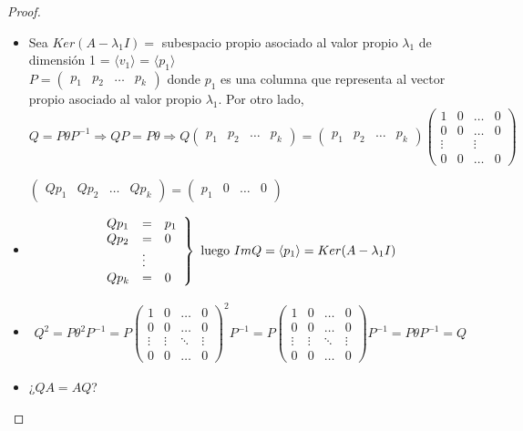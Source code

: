 \begin{proof}
    \begin{itemize}
        \item Sea $Ker(A - \lambda_1I) =$ subespacio propio asociado al valor propio $\lambda_1$ de dimensión 1 = $\langle v_1 \rangle$ = $\langle p_1 \rangle$ \\
            $P = \begin{pmatrix}
                p_1 & p_2 & \hdots & p_k
            \end{pmatrix}$ donde $p_1$ es una columna que representa al vector propio asociado al valor propio $\lambda_1$.
            Por otro lado, $Q = P\theta P^{-1} \Rightarrow QP = P\theta \Rightarrow Q \begin{pmatrix}
                p_1 & p_2 & \hdots & p_k
            \end{pmatrix} = \begin{pmatrix}
                p_1 & p_2 & \hdots & p_k
            \end{pmatrix} \begin{pmatrix}
        1 & 0 & \hdots & 0 \\
        0 & 0 & \hdots & 0 \\
        \vdots & & \vdots & \\
        0 & 0 & \hdots & 0
    \end{pmatrix}$

    $ \begin{pmatrix}
        Qp_1 & Qp_2 & \hdots & Qp_k
    \end{pmatrix} = \begin{pmatrix}
        p_1 & 0 & \hdots & 0
    \end{pmatrix}$

\item
    $$ \left.\begin{array}{l l l}
        Qp_1 & = & p_1 \\
        Qp_2 & = & 0 \\
         & \vdots & \\
        Qp_k & = & 0
    \end{array}\right\} \text{ luego } Im Q = \langle p_1 \rangle = Ker (A - \lambda_1 I)$$
\item
    \begin{align*}
        \label{}
        Q^2 = P\theta^2 P^{-1} = P \begin{pmatrix}
            1 & 0 & \hdots & 0 \\
            0 & 0 & \hdots & 0 \\
            \vdots & \vdots & \ddots & \vdots \\
            0 & 0 & \hdots & 0
        \end{pmatrix}^2 P^{-1} = P \begin{pmatrix}
            1 & 0 & \hdots & 0 \\
            0 & 0 & \hdots & 0 \\
            \vdots & \vdots & \ddots & \vdots \\
            0 & 0 & \hdots & 0
        \end{pmatrix}P^{-1} = P\theta P^{-1} = Q
    \end{align*}
\item
    ¿$QA = AQ$?


\end{itemize}
\end{proof}
